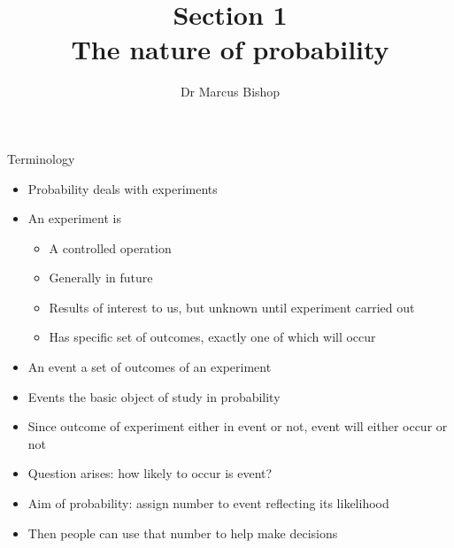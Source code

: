 \documentclass[handout]{beamer}
\title[\S1]{Section 1\\The nature of probability}
\author{Dr Marcus Bishop}
\theoremstyle{definition}
\begin{document}
\begin{frame}\titlepage\end{frame}
\LogoOff

\begin{frame}{Terminology}
\begin{itemize}
\item Probability deals with \alert{experiments}
\item An \alert{experiment} is
\begin{itemize}
\item A controlled operation
\item Generally in future
\item Results of interest to us, but unknown until experiment
carried out
\item Has specific set of \alert{outcomes}, exactly
one of which will occur
\end{itemize}
\item An \alert{event} a set of outcomes of an experiment
\item Events the basic object of study in probability
\item Since outcome of experiment either in event or not,
event will either occur or not
\item Question arises: how likely to occur is event?
\item Aim of probability: assign number to event
reflecting its likelihood
\item Then people can use that number to help make decisions
\end{itemize}
\end{frame}
\end{document}
